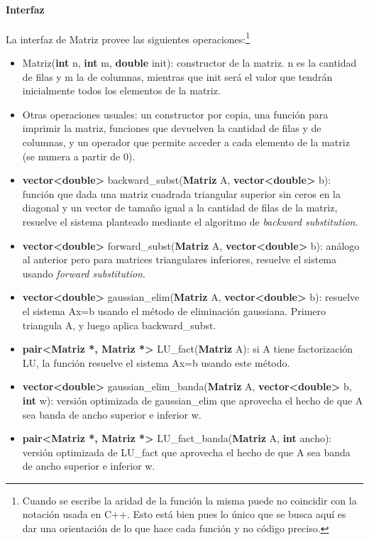 \paragraph{Interfaz}
La interfaz de Matriz provee las siguientes operaciones:\footnote{Cuando se escribe la aridad de la función la misma puede no coincidir con la notación usada en C++. Esto está bien pues lo único que se busca aquí es dar una orientación de lo que hace cada función y no código preciso.}

\begin{itemize}
	\item Matriz(\textbf{int} n, \textbf{int} m, \textbf{double} init): constructor de la matriz. n es la cantidad de filas y m la de columnas, mientras que init será el valor que tendrán inicialmente todos los elementos de la matriz.

	\item Otras operaciones usuales: un constructor por copia, una función para imprimir la matriz, funciones que devuelven la cantidad de filas y de columnas, y un operador que permite acceder a cada elemento de la matriz (se numera a partir de 0).

	\item \textbf{vector<double>} backward\_subst(\textbf{Matriz} A, \textbf{vector<double>} b): función que dada una matriz cuadrada triangular superior sin ceros en la diagonal y un vector de tamaño igual a la cantidad de filas de la matriz, resuelve el sistema planteado mediante el algoritmo de \textit{backward substitution}.

	\item \textbf{vector<double>} forward\_subst(\textbf{Matriz} A, \textbf{vector<double>} b): análogo al anterior pero para matrices triangulares inferiores, resuelve el sistema usando \textit{forward substitution}.

	\item \textbf{vector<double>} gaussian\_elim(\textbf{Matriz} A, \textbf{vector<double>} b): resuelve el sistema Ax=b usando el método de eliminación gaussiana. Primero triangula A, y luego aplica backward\_subst.

	\item \textbf{pair<Matriz *, Matriz *>} LU\_fact(\textbf{Matriz} A): si A tiene factorización LU, la función resuelve el sistema Ax=b usando este método.
	
	\item \textbf{vector<double>} gaussian\_elim\_banda(\textbf{Matriz} A, \textbf{vector<double>} b, \textbf{int} w): versión optimizada de gaussian\_elim que aprovecha el hecho de que A sea banda de ancho superior e inferior w.
	
	\item \textbf{pair<Matriz *, Matriz *>} LU\_fact\_banda(\textbf{Matriz} A, \textbf{int} ancho): versión optimizada de LU\_fact que aprovecha el hecho de que A sea banda de ancho superior e inferior w.
\end{itemize}

